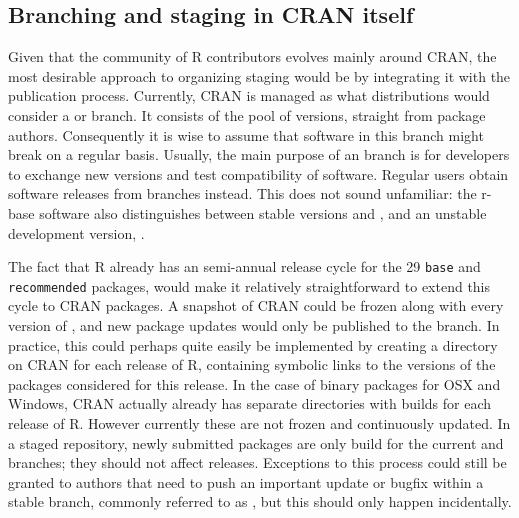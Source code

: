 \subsection{Branching and staging in CRAN itself}

Given that the community of R contributors evolves mainly around CRAN, the most
desirable approach to organizing staging would be by integrating it with the
publication process. Currently, CRAN is managed as what distributions would
consider a  or  branch. It consists of the pool
of  versions, straight from package authors. Consequently it
is wise to assume that software in this branch might break on a regular
basis. Usually, the main purpose of an
 branch is for developers to exchange new versions and test
compatibility of software. Regular users obtain software releases from
 branches instead. This does not sound unfamiliar: the r-base
software also distinguishes between stable versions  and
, and an unstable development version, .

The fact that R already has an semi-annual release cycle for the 29 \texttt{base}
and \texttt{recommended} packages, would make it relatively straightforward to
extend this cycle to CRAN packages. A snapshot of CRAN could be frozen along
with every version of , and new package updates would only be
published to the  branch. In practice, this could perhaps quite
easily be implemented by creating a directory on CRAN for each release of R,
containing symbolic links to the versions of the packages considered
 for this release. In the case of binary packages for OSX and
Windows, CRAN actually already has separate directories with builds for each
release of R. However currently these are not frozen and continuously updated.
In a staged repository, newly submitted packages are only build for the current
 and  branches; they should not affect 
releases. Exceptions to this process could still be granted to authors that need
to push an important update or bugfix within a stable branch, commonly referred
to as , but this should only happen incidentally.

